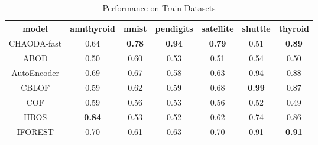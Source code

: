 

\begin{table*}[!t]
\renewcommand{\arraystretch}{1.25}
\caption{Performance on Train Datasets}
\label{table:results:train-performance}
\centering
\begin{tabular}{|c|c|c|c|c|c|c|}
\hline
\textbf{\textbf{model}} & \textbf{\textbf{annthyroid}} & \textbf{\textbf{mnist}} & \textbf{\textbf{pendigits}} & \textbf{\textbf{satellite}} & \textbf{\textbf{shuttle}} & \textbf{\textbf{thyroid}} \\
\hline
                CHAODA-fast &                         0.64 &           \textbf{0.78} &               \textbf{0.94} &               \textbf{0.79} &                      0.51 &             \textbf{0.89} \\
\hline
                        ABOD &                         0.50 &                    0.60 &                        0.53 &                        0.51 &                      0.54 &                      0.50 \\
\hline
                AutoEncoder &                         0.69 &                    0.67 &                        0.58 &                        0.63 &                      0.94 &                      0.88 \\
\hline
                        CBLOF &                         0.59 &                    0.62 &                        0.59 &                        0.68 &             \textbf{0.99} &                      0.87 \\
\hline
                        COF &                         0.59 &                    0.56 &                        0.53 &                        0.56 &                      0.52 &                      0.49 \\
\hline
                        HBOS &                \textbf{0.84} &                    0.53 &                        0.52 &                        0.62 &                      0.74 &                      0.86 \\
\hline
                IFOREST &                         0.70 &                    0.61 &                        0.63 &                        0.70 &                      0.91 &             \textbf{0.91} \\

\end{tabular}
\end{table*}
